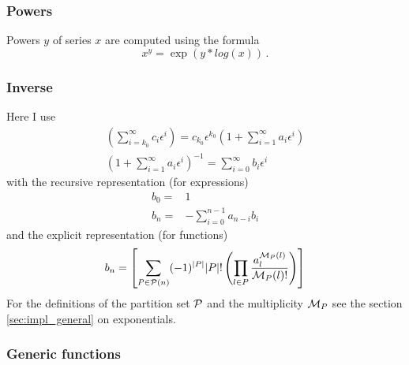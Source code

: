 \documentclass{article}
\begin{document}
\subsubsection{Powers}
\label{sec:impl_pow}

Powers $y$ of series $x$ are computed using the formula
\begin{equation}
  \label{eq:pow}
  x^y=\exp(y*log(x))\,.
\end{equation}


\subsubsection{Inverse}
\label{sec:impl_inverse}

Here I use
\begin{align}
  \label{eq:inv}
  \left(\sum_{i=k_0}^{\infty}c_i
    \epsilon^i\right)=c_{k_0}\epsilon^{k_0}\left(1+\sum_{i=1}^{\infty}a_i
    \epsilon^i\right)\\
\left(1+\sum_{i=1}^{\infty}a_i \epsilon^i\right)^{-1}=\sum_{i=0}^{\infty}b_i \epsilon^i
\end{align}
with the recursive representation (for expressions)
\begin{align}
  \label{eq:inv_rec}
  b_0=&1\\
  b_n=&-\sum_{i=0}^{n-1} a_{n-i}b_i 
\end{align}
and the explicit representation (for functions)
\begin{equation}
  \label{eq:inv_expl}
  b_n=\left[\sum_{P \in {\cal P}(n)} (-1)^{|P|}|P|!\left(\prod_{l \in P} \frac{a^{{\cal M}_P(l)}_l}{{\cal M}_P(l)!} \right)\right]
\end{equation}
For the definitions of the partition set ${\cal P}$ and the
multiplicity ${\cal M}_P$ see the section \ref{sec:impl_general} on
exponentials.

\subsubsection{Generic functions}
\label{sec:generic_fun}
\end{document}
